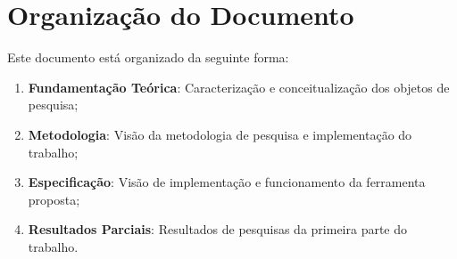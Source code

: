 \section{Organização do Documento}
\label{sec:org}

Este documento está organizado da seguinte forma:

\begin{enumerate}
  \item \textbf{Fundamentação Teórica}: Caracterização e conceitualização dos
    objetos de pesquisa;
  \item \textbf{Metodologia}: Visão da metodologia de pesquisa e implementação
    do trabalho;
  \item \textbf{Especificação}: Visão de implementação e funcionamento da
    ferramenta proposta;
  \item \textbf{Resultados Parciais}: Resultados de pesquisas da primeira
    parte do trabalho.
\end{enumerate}

